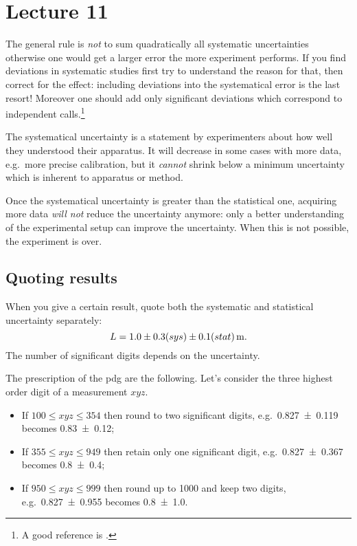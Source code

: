 
\chapter{Lecture 11}

The general rule is \emph{not} to sum quadratically all systematic uncertainties otherwise one would get a larger error the more experiment performs.
If you find deviations in systematic studies first try to understand the reason for that, then correct for the effect: including deviations into the systematical error is the last resort!
Moreover one should add only significant deviations which correspond to independent calls.\footnote{A good reference is \cite{barlow:syst_err}.}


The systematical uncertainty is a statement by experimenters about how well they understood their apparatus.
It will decrease in some cases with more data, e.g.~more precise calibration, but it \emph{cannot} shrink below a minimum uncertainty which is inherent to apparatus or method.


Once the systematical uncertainty is greater than the statistical one, acquiring more data \emph{will not} reduce the uncertainty anymore: only a better understanding of the experimental setup can improve the uncertainty.
When this is not possible, the experiment is over.


\section{Quoting results}
When you give a certain result, quote  both the systematic and statistical uncertainty separately:
\begin{equation}
	L = \SI[parse-numbers=false]{1.0 \pm 0.3 (sys) \pm 0.1 (stat)}{\meter}.
\end{equation}
The number of significant digits depends on the uncertainty.


The prescription of the \ac{pdg} are the following.
Let's consider the three highest order digit of a measurement $xyz$.
\begin{itemize}
	\item
		If $\num{100}\le xyz \le \num{354}$ then round to two significant digits, e.g.~\num{.827 \pm .119} becomes \num{.83 \pm .12};
	\item
		If $\num{355}\le xyz \le \num{949}$ then retain only one significant digit, e.g.~\num{.827 \pm .367} becomes \num{.8 \pm .4};
	\item
		If $\num{950}\le xyz \le \num{999}$ then round up to \num{1000} and keep two digits, e.g.~\num{.827 \pm .955} becomes \num{.8 \pm 1.0}.
\end{itemize}

